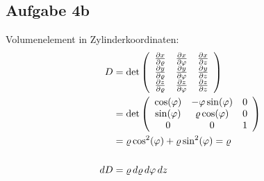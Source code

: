 \documentclass[a4paper,10pt]{extarticle}
\begin{document}
  \subsection*{Aufgabe 4b}
  Volumenelement in Zylinderkoordinaten:
  \begin{align*}
  D &= \det \left(\begin{array}{c c c}
    \pdv{x}{\varrho} & \pdv{x}{\varphi} & \pdv{x}{z} \\
    \pdv{y}{\varrho} & \pdv{y}{\varphi} & \pdv{y}{z} \\
    \pdv{z}{\varrho} & \pdv{z}{\varphi} & \pdv{z}{z} \\
  \end{array}\right) \\
  &= \det \left(\begin{array}{c c c}
    \cos(\varphi) & -\varphi \sin(\varphi) & 0 \\
    \sin(\varphi) & \varrho \cos(\varphi) & 0 \\
    0 & 0 & 1 \\
  \end{array}\right) \\
  &= \varrho \cos^2(\varphi) + \varrho \sin^2(\varphi) = \varrho \\ \\
  dD &= \varrho \,d\varrho \, d\varphi \, dz
  \end{align*}
\end{document}
